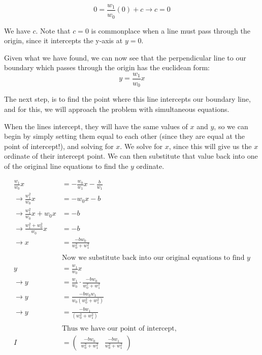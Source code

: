 \documentclass[a4paper]{article}
\begin{document}
\begin{equation}
	0=\frac{w_1}{w_0}(0)+c \to c=0
\end{equation}

We have $c$. Note that $c=0$ is commonplace when a line must pass through the origin, since it intercepts the y-axis at $y=0$.

Given what we have found, we can now see that the perpendicular line to our boundary which passes through the origin has the euclidean form:
\begin{equation}
	y=\frac{w_1}{w_0}x
\end{equation}

The next step, is to find the point where this line intercepts our boundary line, and for this, we will approach the problem with simultaneous equations.

When the lines intercept, they will have the same values of $x$ and $y$, so we can begin by simply setting them equal to each other (since they are equal
at the point of intercept!), and solving for $x$. We solve for $x$, since this will give us the $x$ ordinate of their intercept point. We can then substitute
that value back into one of the original line equations to find the $y$ ordinate.

\begin{equation}\begin{split}
		\frac{w_1}{w_0}x &= -\frac{w_0}{w_1}x-\frac{b}{w_1} \\
		\to \frac{w_1^2}{w_0}x &= -w_0x-b \\
		\to \frac{w_1^2}{w_0}x+w_0x &= -b \\
		\to \frac{w_1^2+w_0^2}{w_0}x &= -b \\
		\to x &= \frac{-bw_0}{w_0^2+w_1^2} \\ \\
		&\textrm{Now we substitute back into our original equations to find }y \\
		y &= \frac{w_1}{w_0}x \\
		\to y &= \frac{w_1}{w_0}\cdot\frac{-bw_0}{w_0^2+w_1^2} \\
		\to y &= \frac{-bw_0w_1}{w_0\left(w_0^2+w_1^2\right)} \\
		\to y &= \frac{-bw_1}{\left(w_0^2+w_1^2\right)} \\ \\
		&\textrm{Thus we have our point of intercept, } \\
		I &= \left(\begin{matrix}
				\frac{-bw_0}{w_0^2+w_1^2} & \frac{-bw_1}{w_0^2+w_1^2}
			\end{matrix}\right)
	\end{split}\end{equation}
\end{document}
